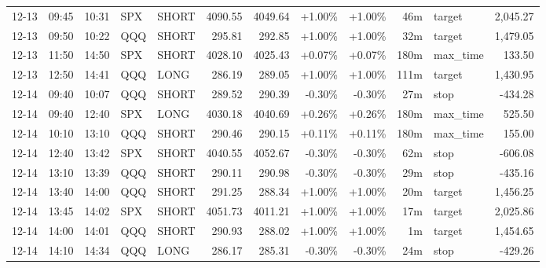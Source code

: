 \documentclass[11pt,a4paper,twoside]{article}
\begin{document}
\begin{center}
\begin{longtable}{>{\color{txtmain}}l l l l l r r r r r >{\color{txtmain}}l r}
12-13 & 09:45 & 10:31 & SPX & SHORT & 4090.55 & 4049.64 & \textcolor{wingreen}{+1.00\%} & \textcolor{wingreen}{+1.00\%} & 46m & target & \textcolor{wingreen}{2,045.27} \\
12-13 & 09:50 & 10:22 & QQQ & SHORT & 295.81 & 292.85 & \textcolor{wingreen}{+1.00\%} & \textcolor{wingreen}{+1.00\%} & 32m & target & \textcolor{wingreen}{1,479.05} \\
12-13 & 11:50 & 14:50 & SPX & SHORT & 4028.10 & 4025.43 & \textcolor{wingreen}{+0.07\%} & \textcolor{wingreen}{+0.07\%} & 180m & max\_time & \textcolor{wingreen}{133.50} \\
12-13 & 12:50 & 14:41 & QQQ & LONG & 286.19 & 289.05 & \textcolor{wingreen}{+1.00\%} & \textcolor{wingreen}{+1.00\%} & 111m & target & \textcolor{wingreen}{1,430.95} \\
12-14 & 09:40 & 10:07 & QQQ & SHORT & 289.52 & 290.39 & \textcolor{lossred}{-0.30\%} & \textcolor{lossred}{-0.30\%} & 27m & stop & \textcolor{lossred}{-434.28} \\
12-14 & 09:40 & 12:40 & SPX & LONG & 4030.18 & 4040.69 & \textcolor{wingreen}{+0.26\%} & \textcolor{wingreen}{+0.26\%} & 180m & max\_time & \textcolor{wingreen}{525.50} \\
12-14 & 10:10 & 13:10 & QQQ & SHORT & 290.46 & 290.15 & \textcolor{wingreen}{+0.11\%} & \textcolor{wingreen}{+0.11\%} & 180m & max\_time & \textcolor{wingreen}{155.00} \\
12-14 & 12:40 & 13:42 & SPX & SHORT & 4040.55 & 4052.67 & \textcolor{lossred}{-0.30\%} & \textcolor{lossred}{-0.30\%} & 62m & stop & \textcolor{lossred}{-606.08} \\
12-14 & 13:10 & 13:39 & QQQ & SHORT & 290.11 & 290.98 & \textcolor{lossred}{-0.30\%} & \textcolor{lossred}{-0.30\%} & 29m & stop & \textcolor{lossred}{-435.16} \\
12-14 & 13:40 & 14:00 & QQQ & SHORT & 291.25 & 288.34 & \textcolor{wingreen}{+1.00\%} & \textcolor{wingreen}{+1.00\%} & 20m & target & \textcolor{wingreen}{1,456.25} \\
12-14 & 13:45 & 14:02 & SPX & SHORT & 4051.73 & 4011.21 & \textcolor{wingreen}{+1.00\%} & \textcolor{wingreen}{+1.00\%} & 17m & target & \textcolor{wingreen}{2,025.86} \\
12-14 & 14:00 & 14:01 & QQQ & SHORT & 290.93 & 288.02 & \textcolor{wingreen}{+1.00\%} & \textcolor{wingreen}{+1.00\%} & 1m & target & \textcolor{wingreen}{1,454.65} \\
12-14 & 14:10 & 14:34 & QQQ & LONG & 286.17 & 285.31 & \textcolor{lossred}{-0.30\%} & \textcolor{lossred}{-0.30\%} & 24m & stop & \textcolor{lossred}{-429.26} \\

\end{longtable}
\end{center}
\end{document}
